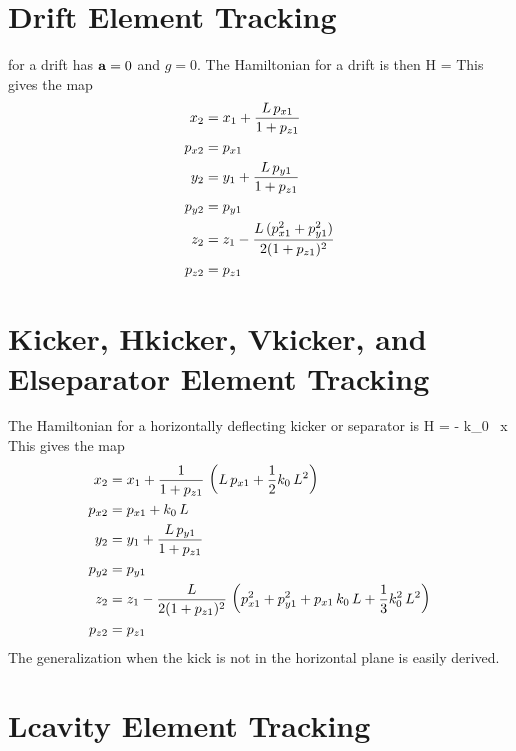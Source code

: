 \section{Drift Element Tracking}
\label{s:drift.std}

 for a drift has ${\bf a} = 0$ and $g = 0$. The Hamiltonian for a
drift is then
\Begineq
  H =  
\Endeq
This gives the map
\begin{align}
  x_2    &= x_1 + \frac{L \, p_{x1}}{1 + p_{z1}} \nonumber \\
  p_{x2} &= p_{x1}  \nonumber \\
  y_2    &= y_1 + \frac{L \, p_{y1}}{1 + p_{z1}} \nonumber \\
  p_{y2} &= p_{y1}  \\
  z_2    &= z_1 - \frac{L \, (p_{x1}^2 + p_{y1}^2)}{2 (1 + p_{z1})^2} \nonumber \\
  p_{z2} &= p_{z1} \nonumber
\end{align}

\section{Kicker, Hkicker, Vkicker, and Elseparator Element Tracking}
\label{s:kicker.std}

The Hamiltonian for a horizontally deflecting kicker or separator is
\Begineq
  H =  - k_0 \, x 
\Endeq
This gives the map
\begin{align}
  x_2    &= x_1 + \frac{1}{1 + p_{z1}} \, \left( L \, p_{x1} + \frac{1}{2} k_0 \, L^2 \right) \nonumber \\
  p_{x2} &= p_{x1} + k_0 \, L \nonumber \\
  y_2    &= y_1 + \frac{L \, p_{y1}}{1 + p_{z1}} \nonumber \\
  p_{y2} &= p_{y1}  \\
  z_2    &= z_1 - \frac{L}{2 (1 + p_{z1})^2} \, 
    \left( p_{x1}^2 + p_{y1}^2 + p_{x1} \, k_0 \, L + \frac{1}{3} k_0^2 \, L^2 \right) \nonumber \\
  p_{z2} &= p_{z1} \nonumber
\end{align}
The generalization when the kick is not in the horizontal plane is easily derived.

\section{Lcavity Element Tracking}
\label{s:lcavity.std}

